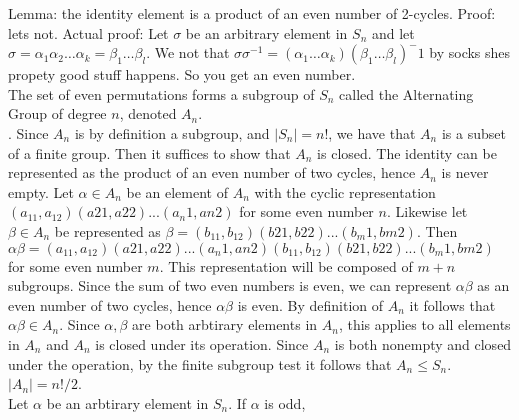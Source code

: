 \documentclass{article}
\begin{document}
 Lemma: the identity element is a product of an even number of 2-cycles. Proof: lets not. Actual proof: Let $\sigma$ be an arbitrary element in $S_n$ and let $\sigma = \alpha_1\alpha_2\dots \alpha_k = \beta_1\dots\beta_l$. We not that $\sigma\sigma^{-1} = (\alpha_1\dots\alpha_k)(\beta_1\dots\beta_l)^-1$ by socks shes propety good stuff happens. So you get an even number. \\

 The set of even permutations forms a subgroup of $S_n$ called the Alternating Group of degree $n$, denoted $A_n$. \\

. Since $A_n$ is by definition a subgroup, and $|S_n| = n!$, we have that $A_n$ is a subset of a finite group. Then it suffices to show that $A_n$ is closed. The identity can be represented as the product of an even number of two cycles, hence $A_n$ is never empty. Let $\alpha \in A_n$ be an element of $A_n$ with the cyclic representation$ (a_11,a_12)(a21, a22)...(a_n1,an2)$ for some even number $n$. Likewise let $\beta \in A_n$ be represented as $\beta = (b_11,b_12)(b21, b22)...(b_m1,bm2)$. Then $\alpha\beta = (a_11,a_12)(a21, a22)...(a_n1,an2)(b_11,b_12)(b21, b22)...(b_m1,bm2)$ for some even number $m$. This representation will be composed of $m+n$ subgroups. Since the sum of two even numbers is even, we can represent $\alpha\beta$ as an even number of two cycles, hence $\alpha\beta$ is even. By definition of $A_n$ it follows that $\alpha\beta \in A_n$. Since $\alpha,\beta$ are both arbtirary elements in $A_n$, this applies to all elements in $A_n$ and $A_n$ is closed under its operation. Since $A_n$ is both nonempty and closed under the operation, by the finite subgroup test it follows that $A_n\le S_n$.\\

 $|A_n| = n!/2$. \\
 Let $\alpha$ be an arbtirary element in $S_n$. If $\alpha$ is odd,  
\end{document}
